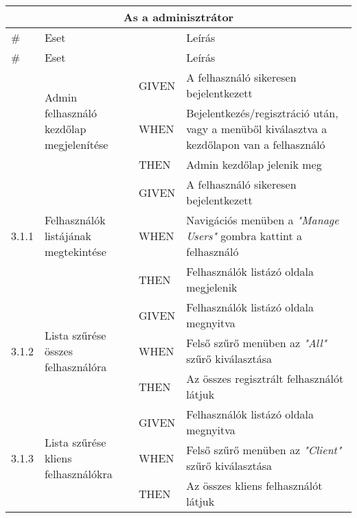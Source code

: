 \begin{center}
	\begin{longtable}{ | p{} | p{} | p{} | p{} | }
			
			\hline
			\multicolumn{4}{|c|}{\textbf{As a adminisztrátor}}
			\\ \hline
			
			\# & Eset & & Leírás
			\\ \hline \hline
			\endfirsthead %
			
			\hline
			\# & Eset & & Leírás
			\\ \hline \hline
			\endhead %
			
			\hline
			\endfoot %
			
			\endlastfoot %

			\multirow{3}{*}{3.0.1} 
			& \multirow{3}{=}{Admin felhasználó kezdőlap megjelenítése} 
			& GIVEN 
			& A felhasználó sikeresen bejelentkezett \\
			\cline{3-4}
			& & WHEN 
			& Bejelentkezés/regisztráció után, vagy a menüből kiválasztva a kezdőlapon van a felhasználó \\
			\cline{3-4}
			& & THEN 
			& Admin kezdőlap jelenik meg \\
			\hline
			
			
			\multirow{3}{*}{3.1.1} 
			& \multirow{3}{=}{Felhasználók listájának megtekintése} 
			& GIVEN 
			& A felhasználó sikeresen bejelentkezett \\
			\cline{3-4}
			& & WHEN 
			& Navigációs menüben a \emph{"Manage Users"} gombra kattint a felhasználó \\
			\cline{3-4}
			& & THEN 
			& Felhasználók listázó oldala megjelenik \\
			\hline

			\multirow{3}{*}{3.1.2} 
			& \multirow{3}{=}{Lista szűrése összes felhasználóra} 
			& GIVEN 
			& Felhasználók listázó oldala megnyitva \\
			\cline{3-4}
			& & WHEN 
			& Felső szűrő menüben az \emph{"All"} szűrő kiválasztása \\
			\cline{3-4}
			& & THEN 
			& Az összes regisztrált felhasználót látjuk \\
			\hline

			\multirow{3}{*}{3.1.3} 
			& \multirow{3}{=}{Lista szűrése kliens felhasználókra} 
			& GIVEN 
			& Felhasználók listázó oldala megnyitva \\
			\cline{3-4}
			& & WHEN 
			& Felső szűrő menüben az \emph{"Client"} szűrő kiválasztása \\
			\cline{3-4}
			& & THEN 
			& Az összes kliens felhasználót látjuk \\
			\hline


\end{longtable}
\end{center}
